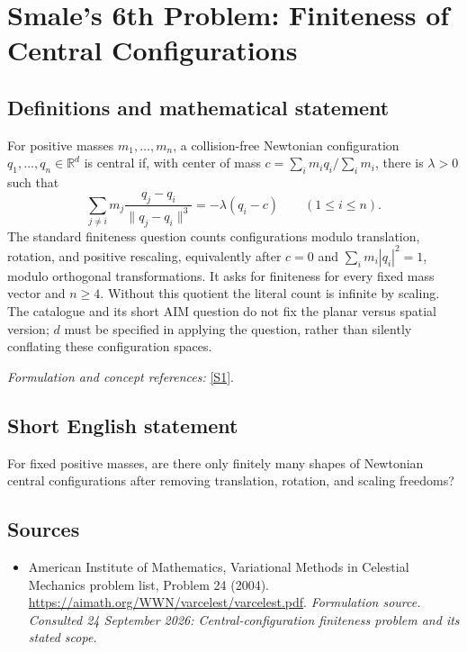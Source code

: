 \documentclass[11pt]{article}
\begin{document}
\section*{\texorpdfstring{Smale's 6th Problem: Finiteness of Central Configurations}{Smale's 6th Problem: Finiteness of Central Configurations}}\label{50}
\subsection{Definitions and mathematical statement}
For positive masses $m_1,\ldots,m_n$, a collision-free Newtonian configuration $q_1,\ldots,q_n\in{\mathbb{R}}^d$ is central if, with center of mass $c=\sum_i m_iq_i/\sum_i m_i$, there is $\lambda>0$ such that
\[
 \sum_{j\ne i}m_j\frac{q_j-q_i}{\|q_j-q_i\|^3}
 =-\lambda(q_i-c)\qquad(1\le i\le n).
\]
The standard finiteness question counts configurations modulo translation, rotation, and positive rescaling, equivalently after $c=0$ and $\sum_i m_i|q_i|^2=1$, modulo orthogonal transformations. It asks for finiteness for every fixed mass vector and $n\ge4$. Without this quotient the literal count is infinite by scaling. The catalogue and its short AIM question do not fix the planar versus spatial version; $d$ must be specified in applying the question, rather than silently conflating these configuration spaces.
\par\smallskip\textit{Formulation and concept references:} \href{https://aimath.org/WWN/varcelest/varcelest.pdf}{[S1]}.

\subsection{Short English statement}
For fixed positive masses, are there only finitely many shapes of Newtonian central configurations after removing translation, rotation, and scaling freedoms?
\subsection{Sources}
\begin{itemize}
\item[S1]American Institute of Mathematics, Variational Methods in Celestial Mechanics problem list, Problem 24 (2004).
\url{https://aimath.org/WWN/varcelest/varcelest.pdf}.
\textit{Formulation source. Consulted 24 September 2026: Central-configuration finiteness problem and its stated scope.}
\end{itemize}
\end{document}
